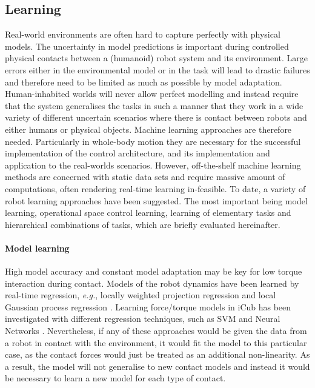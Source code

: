 \documentclass[final,5p,twocolumn]{elsarticle}
\begin{document}
\subsection{Learning}
Real-world environments are often hard to capture perfectly with physical models. The uncertainty in model predictions is important during controlled physical contacts between a (humanoid) robot system and its environment. Large errors either in the environmental model or in the task will lead to drastic failures and therefore need to be limited as much as possible by model adaptation. Human-inhabited worlds will never allow perfect modelling and instead require that the system generalises the tasks in such a manner that they work in a wide variety of different uncertain scenarios where there is contact between robots and either humans or physical objects. Machine learning approaches are therefore needed. Particularly in whole-body motion they are necessary for the successful implementation of the control architecture, and its implementation and application to the real-worlds scenarios. However, off-the-shelf machine learning methods are concerned with static data sets and require massive amount of computations, often rendering real-time learning in-feasible. To date, a variety of robot learning approaches have been suggested. The most important being model learning, operational space control learning, learning of elementary tasks and hierarchical combinations of tasks, which are briefly evaluated hereinafter.

\paragraph{Model learning}
 High model accuracy and constant model adaptation may be key for low torque interaction during contact. Models of the robot dynamics have been learned by real-time regression, \textit{e.g.}, locally weighted projection regression \cite{Schaal2002a} and local Gaussian process regression \cite{Nguyen-tuong2010a}. Learning force/torque models in iCub has been investigated with different regression techniques, such as SVM and Neural Networks \cite{Fumagalli2010learning}. Nevertheless, if any of these approaches would be given the data from a robot in contact with the environment, it would fit the model to this particular case, as the contact forces would just be treated as an additional non-linearity. As a result, the model will not generalise to new contact models and instead it would be necessary to learn a new model for each type of contact.
\end{document}
